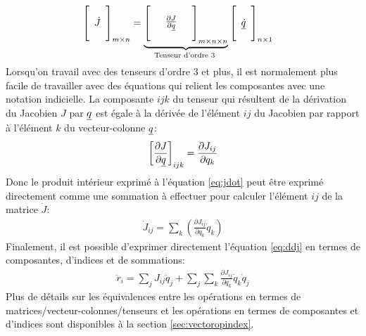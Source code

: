 \begin{align}
\left[ \begin{array}{c}  \\ \dot{J} \\ \\
\end{array} \right]_{m \times n}
&= 
\underbrace{
\left[ \begin{array}{c c c} 
&&\\
& \frac{ \partial J}{\partial \underline{q}} &\\
&&
\end{array} \right]_{m \times n \times n}}_{\text{Tenseur d'ordre 3
}}
\left[ \begin{array}{c} 
\\ \underline{\dot{q}} \\ \\
\end{array} \right]_{n \times 1}
\label{eq:jdot}
\end{align}
Lorsqu'on travail avec des tenseurs d'ordre 3 et plus, il est normalement plus facile de travailler avec des équations qui relient les composantes avec une notation indicielle. La composante $ijk$ du tenseur qui résultent de la dérivation du Jacobien $J$ par $\underline{q}$ est égale à la dérivée de l'élément $ij$ du Jacobien par rapport à l'élément $k$ du vecteur-colonne $\underline{q}$:
\begin{align}
\left[\frac{ \partial J}{\partial \underline{q}} \right]_{ijk} = \frac{ \partial J_{ij} }{\partial q_k } 
\end{align}
 Donc le produit intérieur exprimé à l'équation \eqref{eq:jdot} peut être exprimé directement comme une sommation à effectuer pour calculer l'élément $ij$ de la matrice $\dot{J}$:
\begin{align}
\dot{J}_{ij} = \sum_k \left( \frac{ \partial J_{ij} }{\partial q_k } \dot{q}_k \right)
\end{align}
Finalement, il est possible d'exprimer directement l'équation \eqref{eq:ddj} en termes de composantes, d'indices et de sommations:
\begin{align}
\ddot{r}_{i} =  
\sum_j J_{ij} \ddot{q}_j
+
\sum_j 
\sum_k  \frac{ \partial J_{ij} }{\partial q_k } \dot{q}_k 
\dot{q}_j
\end{align}
Plus de détails sur les équivalences entre les opérations en termes de matrices/vecteur-colonnes/tenseurs et les opérations en termes de composantes et d'indices sont disponibles à la section \ref{sec:vectoropindex}.





